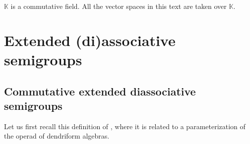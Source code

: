 \documentclass[10pt,a4paper]{amsart}
\numberwithin{equation}{section}
\begin{document}
\begin{Notation}
$\mathbb{K}$ is a commutative field. All the vector spaces in this text are taken over $\mathbb{K}$.
\end{Notation}


\section{Extended (di)associative semigroups}

\subsection{Commutative extended diassociative semigroups}

Let us first recall this definition of \cite{Foissy49}, where it is related to a parameterization of the operad of dendriform algebras.
\end{document}
